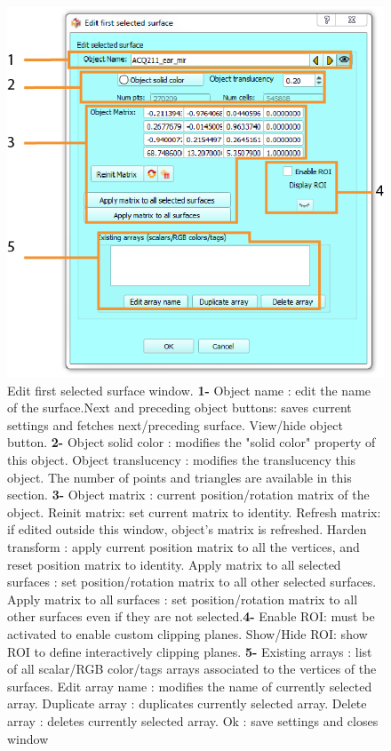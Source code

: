 \begin{figure}
  \centering
  \includegraphics[scale=1]{images/09/edit_surface/edit_surface2.png} 
	\caption{Edit first selected surface window. \textbf{1-} Object name : edit the name of the surface.Next and preceding object buttons: saves current settings and fetches next/preceding surface. View/hide object button.	\textbf{2-} Object solid color : modifies the "solid color" property of this object. Object translucency : modifies the translucency this object. The number of points and triangles are available in this section. \textbf{3-} Object matrix : current position/rotation matrix of the object. Reinit matrix: set current matrix to identity. Refresh matrix: if edited outside this window, object's matrix is refreshed. Harden transform : apply current position matrix to all the vertices, and reset position matrix to identity. Apply matrix to all selected surfaces : set position/rotation matrix to all other selected surfaces. Apply matrix to all  surfaces : set position/rotation matrix to all other surfaces even if they are not selected.\textbf{4-} Enable ROI: must be activated to enable custom clipping planes. Show/Hide ROI: show ROI to define interactively clipping planes. \textbf{5-} Existing arrays : list of all scalar/RGB color/tags arrays associated to the vertices of the surfaces. Edit array name : modifies the name of currently selected array. Duplicate array : duplicates currently selected array. Delete array : deletes currently selected array. Ok : save settings and closes window}
\label{actor_edit}
 
\end{figure}

